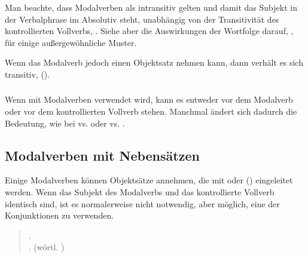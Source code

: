\subsubsection{} Man beachte, dass Modalverben als intransitiv gelten und damit das Subjekt in der Verbalphrase im Absolutiv steht, unabhängig von der Transitivität des kontrollierten Vollverbs,  . Siehe aber die Auswirkungen der Wortfolge darauf, , für einige außergewöhnliche Muster.

Wenn das Modalverb jedoch einen Objektsatz nehmen kann, dann verhält es sich transitiv,   ().

\subsubsection{}\label{syn:modal:neg}
Wenn  mit Modalverben verwendet wird, kann es entweder vor dem Modalverb oder vor dem kontrollierten Vollverb stehen. Manchmal ändert sich dadurch die Bedeutung, wie bei   vs.   oder   vs.  .

\subsection{Modalverben mit Nebensätzen}
\label{syn:modal:new}\label{syn:modal:subclause}
Einige Modalverben können Objektsätze annehmen, die mit  oder  () eingeleitet werden. Wenn das Subjekt des Modalverbs und das kontrollierte Vollverb identisch sind, ist es normalerweise nicht notwendig, aber möglich, eine der Konjunktionen zu verwenden.
 
 
 

\begin{quotation}
	\noindent{}.   \\
	\noindent{}.   (wörtl. )
\end{quotation}

